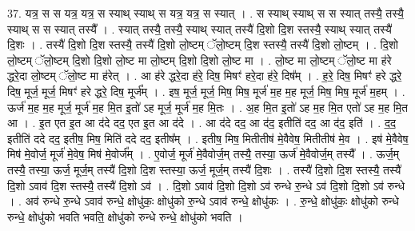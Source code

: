 \documentclass[17pt]{extarticle}
\begin{document}
37. यत्र॒ स स यत्र॒ यत्र॒ स स्याथ् स्याथ् स यत्र॒ यत्र॒ स स्यात् । . स स्याथ् स्याथ् स स स्यात् तस्यै॒ तस्यै॒ स्याथ् स स स्यात् तस्यै᳚ । . स्यात् तस्यै॒ तस्यै॒ स्याथ् स्यात् तस्यै॑ दि॒शो दि॒श स्तस्यै॒ स्याथ् स्यात् तस्यै॑ दि॒शः । . तस्यै॑ दि॒शो दि॒श स्तस्यै॒ तस्यै॑ दि॒शो लो॒ष्टम् ॅलो॒ष्टम् दि॒श स्तस्यै॒ तस्यै॑ दि॒शो लो॒ष्टम् । . दि॒शो लो॒ष्टम् ॅलो॒ष्टम् दि॒शो दि॒शो लो॒ष्ट मा लो॒ष्टम् दि॒शो दि॒शो लो॒ष्ट मा । . लो॒ष्ट मा लो॒ष्टम् ॅलो॒ष्ट मा ह॑रे द्धरे॒दा लो॒ष्टम् ॅलो॒ष्ट मा ह॑रेत् । . आ ह॑रे द्धरे॒दा ह॑रे॒ दिष॒ मिषꣳ॑ हरे॒दा ह॑रे॒ दिष᳚म् । . ह॒रे॒ दिष॒ मिषꣳ॑ हरे द्धरे॒ दिष॒ मूर्ज॒ मूर्ज॒ मिषꣳ॑ हरे द्धरे॒ दिष॒ मूर्ज᳚म् । . इष॒ मूर्ज॒ मूर्ज॒ मिष॒ मिष॒ मूर्ज॑ म॒ह म॒ह मूर्ज॒ मिष॒ मिष॒ मूर्ज॑ म॒हम् । . ऊर्ज॑ म॒ह म॒ह मूर्ज॒ मूर्ज॑ म॒ह मि॒त इ॒तो॑ ऽह मूर्ज॒ मूर्ज॑ म॒ह मि॒तः । . अ॒ह मि॒त इ॒तो॑ ऽह म॒ह मि॒त एतो॑ ऽह म॒ह मि॒त आ । . इ॒त एत इ॒त आ द॑दे दद॒ एत इ॒त आ द॑दे । . आ द॑दे दद॒ आ द॑द॒ इतीति॑ दद॒ आ द॑द॒ इति॑ । . द॒द॒ इतीति॑ ददे दद॒ इतीष॒ मिष॒ मिति॑ ददे दद॒ इतीष᳚म् । . इतीष॒ मिष॒ मितीतीष॑ मे॒वैवेष॒ मितीतीष॑ मे॒व । . इष॑ मे॒वैवेष॒ मिष॑ मे॒वोर्ज॒ मूर्ज॑ मे॒वेष॒ मिष॑ मे॒वोर्ज᳚म् । . ए॒वोर्ज॒ मूर्ज॑ मे॒वैवोर्ज॒म् तस्यै॒ तस्या॒ ऊर्ज॑ मे॒वैवोर्ज॒म् तस्यै᳚ । . ऊर्ज॒म् तस्यै॒ तस्या॒ ऊर्ज॒ मूर्ज॒म् तस्यै॑ दि॒शो दि॒श स्तस्या॒ ऊर्ज॒ मूर्ज॒म् तस्यै॑ दि॒शः । . तस्यै॑ दि॒शो दि॒श स्तस्यै॒ तस्यै॑ दि॒शो ऽवाव॑ दि॒श स्तस्यै॒ तस्यै॑ दि॒शो ऽव॑ । . दि॒शो ऽवाव॑ दि॒शो दि॒शो ऽव॑ रुन्धे रु॒न्धे ऽव॑ दि॒शो दि॒शो ऽव॑ रुन्धे । . अव॑ रुन्धे रु॒न्धे ऽवाव॑ रुन्धे॒ क्षोधु॑कः॒ क्षोधु॑को रु॒न्धे ऽवाव॑ रुन्धे॒ क्षोधु॑कः । . रु॒न्धे॒ क्षोधु॑कः॒ क्षोधु॑को रुन्धे रुन्धे॒ क्षोधु॑को भवति भवति॒ क्षोधु॑को रुन्धे रुन्धे॒ क्षोधु॑को भवति । \newline
\end{document}
